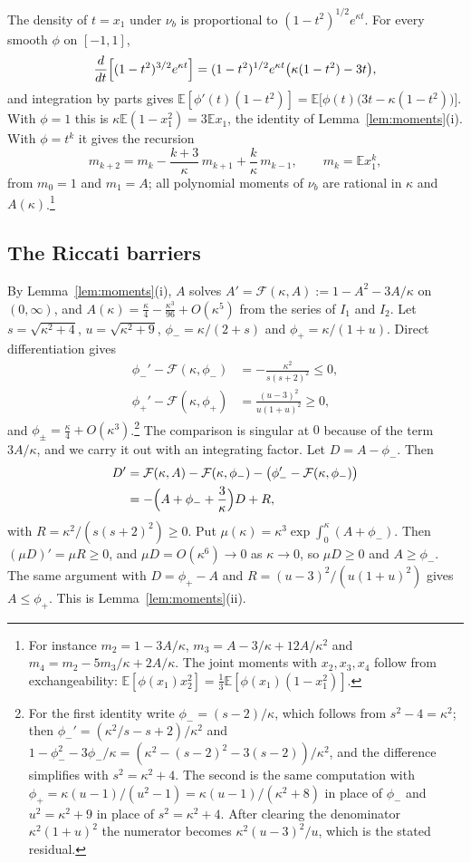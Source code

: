 \documentclass[aps,prd,twocolumn,superscriptaddress,nofootinbib,longbibliography,floatfix,amsmath,amssymb,10pt]{revtex4-2}
\theoremstyle{definition}
\theoremstyle{remark}
\newcommand{\E}{\mathbb{E}}
\begin{document}
The density of $t=x_1$ under $\nu_b$ is proportional to $(1-t^2)^{1/2}e^{
\kappa t}$. For every smooth $\phi$ on $[-1,1]$,
\[
\frac d{dt}\Bigl[(1-t^2)^{3/2}e^{\kappa t}\Bigr]=(1-t^2)^{1/2}e^{\kappa t}
\bigl(\kappa(1-t^2)-3t\bigr),
\]
and integration by parts gives $\E[\phi'(t)(1-t^2)]=\E\bigl[\phi(t)\bigl(3t-
\kappa(1-t^2)\bigr)\bigr]$. With $\phi=1$ this is $\kappa\E(1-x_1^2)=3\E x_1$,
the identity of Lemma~\ref{lem:moments}(i). With $\phi=t^k$ it gives the
recursion
\[
m_{k+2}=m_k-\frac{k+3}\kappa\,m_{k+1}+\frac k\kappa\,m_{k-1},\qquad m_k=\E
x_1^k,
\]
from $m_0=1$ and $m_1=A$; all polynomial moments of $\nu_b$ are rational in
$\kappa$ and $A(\kappa)$.\footnote{For instance $m_2=1-3A/\kappa$,
$m_3=A-3/\kappa+12A/\kappa^2$ and $m_4=m_2-5m_3/\kappa+2A/\kappa$. The joint moments
with $x_2,x_3,x_4$ follow from exchangeability:
$\E[\phi(x_1)x_2^2]=\frac13\E[\phi(x_1)(1-x_1^2)]$.}

\subsection{The Riccati barriers}

By Lemma~\ref{lem:moments}(i), $A$ solves $A'=\mathcal F(\kappa,A):=1-A^2-
3A/\kappa$ on $(0,\infty)$, and $A(\kappa)=\frac\kappa4-\frac{\kappa^3}{96}+
O(\kappa^5)$ from the series of $I_1$ and $I_2$. Let $s=\sqrt{\kappa^2+4}$,
$u=\sqrt{\kappa^2+9}$, $\phi_-=\kappa/(2+s)$ and $\phi_+=\kappa/(1+u)$. Direct
differentiation gives
\[
\begin{aligned}
\phi_-'-\mathcal F(\kappa,\phi_-)&=-\frac{\kappa^2}{s(s+2)^2}\le0,\\
\phi_+'-\mathcal F(\kappa,\phi_+)&=\frac{(u-3)^2}{u(1+u)^2}\ge0,
\end{aligned}
\]
and $\phi_\pm=\frac\kappa4+O(\kappa^3)$.\footnote{For the first identity write
$\phi_-=(s-2)/\kappa$, which follows from $s^2-4=\kappa^2$; then
$\phi_-'=(\kappa^2/s-s+2)/\kappa^2$ and $1-\phi_-^2-3\phi_-/\kappa=
(\kappa^2-(s-2)^2-3(s-2))/\kappa^2$, and the difference simplifies with
$s^2=\kappa^2+4$. The second is the same computation with
$\phi_+=\kappa(u-1)/(u^2-1)=\kappa(u-1)/(\kappa^2+8)$ in place of $\phi_-$
and $u^2=\kappa^2+9$ in place of $s^2=\kappa^2+4$. After clearing the denominator $\kappa^2(1+u)^2$ the
numerator becomes $\kappa^2(u-3)^2/u$, which is the stated residual.} The comparison is singular at $0$
because of the term $3A/\kappa$, and we carry it out with an integrating
factor. Let $D=A-\phi_-$. Then
\[
\begin{aligned}
D'&=\mathcal F(\kappa,A)-\mathcal F(\kappa,\phi_-)-\bigl(\phi_-'-\mathcal F(
\kappa,\phi_-)\bigr)\\
&=-\Bigl(A+\phi_-+\frac3\kappa\Bigr)D+R,
\end{aligned}
\]
with $R=\kappa^2/(s(s+2)^2)\ge0$. Put $\mu(\kappa)=\kappa^3\exp\int_0^\kappa
(A+\phi_-)$. Then $(\mu D)'=\mu R\ge0$, and $\mu D=O(\kappa^6)\to0$ as
$\kappa\to0$, so $\mu D\ge0$ and $A\ge\phi_-$. The same argument with
$D=\phi_+-A$ and $R=(u-3)^2/(u(1+u)^2)$ gives $A\le\phi_+$. This is
Lemma~\ref{lem:moments}(ii).
\end{document}
